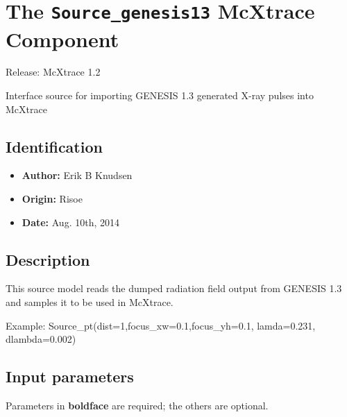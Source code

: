 \section{The \texttt{Source\_genesis13} McXtrace Component}
Release: McXtrace 1.2

Interface source for importing GENESIS 1.3 generated X-ray pulses into McXtrace

\subsection*{Identification}
\begin{itemize}
  \item \textbf{Author:} Erik B Knudsen
  \item \textbf{Origin:} Risoe
  \item \textbf{Date:} Aug. 10th, 2014
\end{itemize}

\subsection*{Description}
This source model reads the dumped radiation field output from GENESIS 1.3 and samples it to be used in McXtrace.

Example: Source\_pt(dist=1,focus\_xw=0.1,focus\_yh=0.1, lamda=0.231, dlambda=0.002)

\subsection*{Input parameters}
Parameters in \textbf{boldface} are required; the others are optional.

